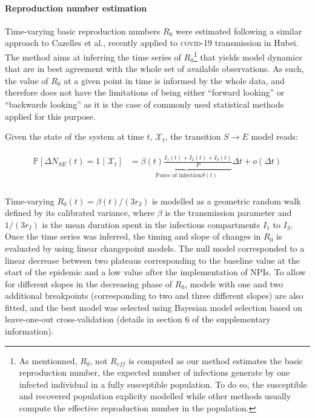  \paragraph{Reproduction number estimation} Time-varying basic reproduction numbers $R_0$ were estimated following a similar approach to Cazelles et al.\cite{Cazelles:AccountingNonstationarityEpidemiology:2018}, recently applied to \textsc{covid}-19 transmission in Hubei\cite{Kucharski:EarlyDynamicsTransmission:2020}. The method aims at inferring the time series of $R_0$\footnote{As mentionned, $R_0$, not $R_{eff}$ is computed as our method estimates the basic reproduction number, \ie the expected number of infections generate by one infected individual in a fully susceptible population. To do so, the susceptible and recovered population explicity modelled  while other methods usually compute the effective reproduction number in the population.} that yields model dynamics that are in best agreement with the whole set of available observations. As such, the value of $R_0$ at a given point in time is informed by the whole data, and therefore does not have the limitations of being either “forward looking” or “backwards looking” as it is the case of commonly used statistical methods applied for this purpose\cite{Wallinga:DifferentEpidemicCurves:2004,Cori:NewFrameworkSoftware:2013,Lipsitch:CommentPanLiu:2020}. 
 
Given the state of the system at time \(t\), \(\mathcal{X}_t\), the transition $S \longrightarrow E$ model reads:

\begin{gather}
\begin{aligned}
    \mathbb{P}\left[ \Delta N_{SE}(t) = 1 \mid\mathcal{X}_t\right] &=  \underbrace{\beta(t)  \frac{I_1(t) + I_2(t) + I_3(t)}{P}}_{\text{Force of infection} S(t)} \Delta t + o(\Delta t)\\
    \end{aligned}
\end{gather}

Time-varying $R_0(t) = \beta(t)/(3r_I)$ is modelled as a geometric random walk defined by its calibrated variance, where $\beta$ is the transmission parameter and $1/(3r_I)$ is the mean duration spent in the infectious compartments $I_1$ to $I_3$. Once the time series was inferred, the timing and slope of changes in $R_0$ is evaluated by using linear changepoint models\cite{Lindelov:McpPackageRegression:2020}. The null model corresponded to a linear decrease between two plateaus corresponding to the baseline value at the start of the epidemic and a low value after the implementation of NPIs. To allow for different slopes in the decreasing phase of $R_0$, models with one and two additional breakpoints (corresponding to two and three different slopes) are also fitted, and the best model was selected using Bayesian model selection based on leave-one-out cross-validation (details in section 6 of the supplementary information). 

